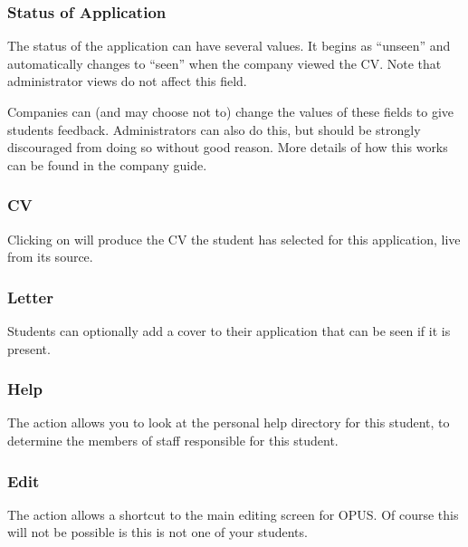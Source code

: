 \documentclass[12 pt]{book}
\begin{document}

\subsubsection{Status of Application}

The status of the application can have several values. It begins as ``unseen''
and automatically changes to ``seen'' when the company viewed the CV. Note that
administrator views do not affect this field.

Companies can (and may choose not to) change the values of these fields to
give students feedback. Administrators can also do this, but should be
strongly discouraged from doing so without good reason. More details of how
this works can be found in the company guide.

\subsubsection{CV}

Clicking on  will produce the CV the student has selected for this
application, live from its source.

\subsubsection{Letter}

Students can optionally add a cover  to their application that
can be seen if it is present.

\subsubsection{Help}

The  action allows you to look at the personal help directory
for this student, to determine the members of staff responsible for this
student.

\subsubsection{Edit}

The  action allows a shortcut to the main editing screen for
OPUS. Of course this will not be possible is this is not one of your students.
\end{document}
